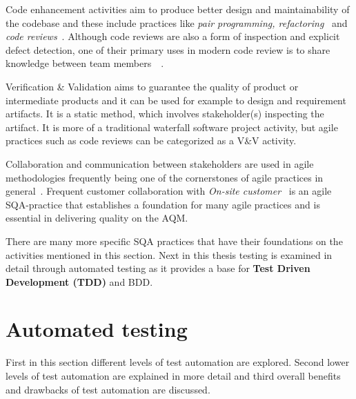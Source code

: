     Code enhancement activities aim to produce better design and maintainability of the codebase and these include practices
    like \textit{pair programming, refactoring}~\cite{huo2004software} and \textit{code reviews}~\cite{rigby2013convergent}.
    Although code reviews are also a form of inspection and explicit defect detection, one of their primary uses in modern
    code review is to share knowledge between team members~\cite{mantyla2014software}~\cite{rigby2013convergent}.

    Verification \& Validation aims to guarantee the quality of product or intermediate products and it can be used for
    example to design and requirement artifacts. It is a static method, which involves stakeholder(s)
    inspecting the artifact. It is more of a traditional waterfall software project activity, but agile practices such as code reviews
    can be categorized as a V\&V activity. ~\cite{huo2004software}

    Collaboration and communication between stakeholders are used in agile methodologies frequently being one of the
    cornerstones of agile practices in general~\cite{huo2004software}. Frequent customer collaboration with \textit{On-site customer}~\cite{huo2004software}
    is an agile SQA-practice that establishes a foundation for many agile practices and is essential in delivering
    quality on the AQM.

    There are many more specific SQA practices that have their foundations on the activities mentioned in this section.
    Next in this thesis testing is examined in detail through automated testing as it provides a base for \textbf{Test Driven Development (TDD)}
    and BDD.

\section{Automated testing}
    First in this section different levels of test automation are explored. Second lower levels of test automation are explained in more
    detail and third overall benefits and drawbacks of test automation are discussed.

